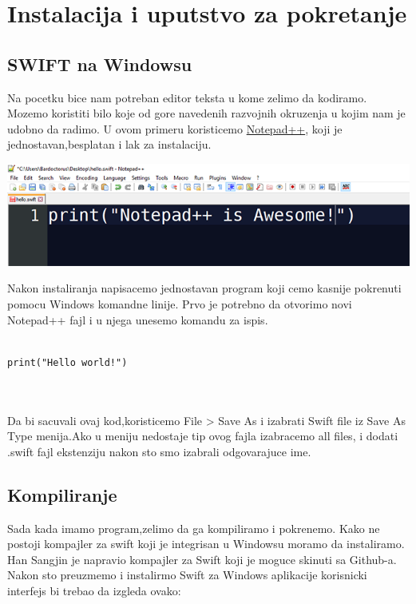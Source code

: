 \documentclass[a4paper]{article}
\begin{document}
\section{Instalacija i uputstvo za pokretanje}	
\label{sec:petiDeo}

\subsection{SWIFT na Windowsu}
\label{subsec:podnaslovWindows}

Na pocetku bice nam potreban editor teksta u kome zelimo da kodiramo. Mozemo koristiti bilo koje od gore navedenih razvojnih okruzenja u kojim nam je udobno da radimo. 
U ovom primeru koristicemo \href{https://notepad-plus-plus.org/download/v7.6.4.html}{Notepad++}, koji je jednostavan,besplatan i lak za instalaciju.
\vspace{5mm}

\includegraphics[scale=0.5]{notepadpp.png}
\vspace{5mm}

Nakon instaliranja napisacemo jednostavan program koji cemo kasnije pokrenuti pomocu Windows komandne linije. Prvo je potrebno da otvorimo novi Notepad++ fajl i u njega unesemo komandu za ispis.

\begin{lstlisting}[caption={},frame=single, label=simple]

print("Hello world!")



\end{lstlisting}
\vspace{5mm}
Da bi sacuvali ovaj kod,koristicemo File > Save As i izabrati Swift file iz Save As Type menija.Ako u meniju nedostaje tip ovog fajla izabracemo all files, i dodati .swift fajl ekstenziju nakon sto smo izabrali odgovarajuce ime.


\subsection{Kompiliranje}
\label{subsec:podnaslovKompiliranje}

Sada kada imamo program,zelimo da ga kompiliramo i pokrenemo. Kako ne postoji kompajler za swift koji je integrisan u Windowsu moramo da instaliramo. Han Sangjin je napravio kompajler za Swift koji je moguce skinuti sa Github-a. Nakon sto preuzmemo i instalirmo Swift za Windows aplikacije korisnicki interfejs bi trebao da izgleda ovako:
\end{document}
